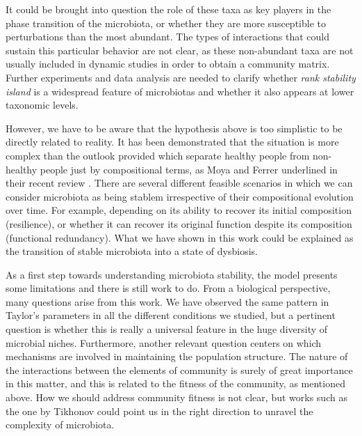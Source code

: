 It could be brought into question the role of these taxa as key players in the phase transition of the microbiota, or whether they are more susceptible to perturbations than the most abundant. The types of interactions that could sustain this particular behavior are not clear, as these non-abundant taxa are not usually included in dynamic studies in order to obtain a community matrix. Further experiments and data analysis are needed to clarify whether \emph{rank stability island} is a widespread feature of microbiotas and whether it also appears at lower taxonomic levels.

However, we have to be aware that the hypothesis above is too simplistic to be directly related to reality. It has been demonstrated that the situation is more complex than the outlook provided which separate healthy people from non-healthy people just by compositional terms, as Moya and Ferrer underlined in their recent review \cite{Moya_trends}. There are several different feasible scenarios in which we can consider microbiota as being stablem irrespective of their compositional evolution over time. For example, depending on its ability to recover its initial composition (resilience), or whether it can recover its original function despite its composition (functional redundancy). What we have shown in this work could be explained as the transition of stable microbiota into a state of dysbiosis.  

As a first step towards understanding microbiota stability, the model presents some limitations and there is still work to do. From a biological perspective, many questions arise from this work. We have observed the same pattern in Taylor's parameters in all the different conditions we studied, but a pertinent question is whether this is really a universal feature in the huge diversity of microbial niches. Furthermore, another relevant question centers on which mechanisms are involved in maintaining the population structure. The nature of the interactions between the elements of community is surely of great importance in this matter, and this is related to the fitness of the community, as mentioned above. How we should address community fitness is not clear, but works such as the one by Tikhonov \cite{tikhonov} could point us in the right direction to unravel the complexity of microbiota.